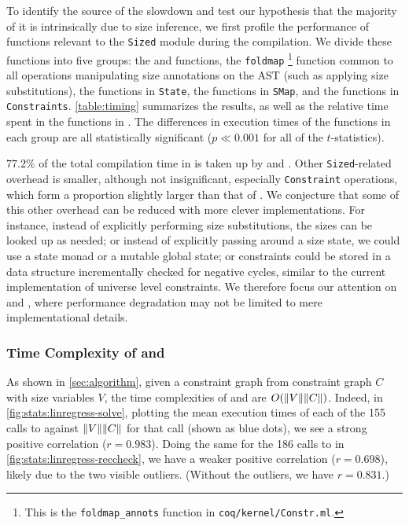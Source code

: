 To identify the source of the slowdown and test our hypothesis that the majority of it
is intrinsically due to size inference,
we first profile the performance of functions relevant to the \texttt{Sized} module during the compilation.
We divide these functions into five groups: the \solve and \RecCheck functions,
the \texttt{foldmap}%
\footnote{This is the \texttt{foldmap\_annots} function in \texttt{coq/kernel/Constr.ml}.}
function common to all operations manipulating size annotations on the AST (such as applying size substitutions),
the functions in \texttt{State}, the functions in \texttt{SMap}, and the functions in \texttt{Constraints}.
\autoref{table:timing} summarizes the results, as well as the relative time spent in the functions in \msetlistsized.
The differences in execution times of the functions in each group are all statistically significant ($p \ll 0.001$ for all of the $t$-statistics).

$77.2\%$ of the total compilation time in \msetlistsized is taken up by \solve and \RecCheck.
Other \texttt{Sized}-related overhead is smaller, although not insignificant,
especially \texttt{Constraint} operations, which form a proportion slightly larger than that of \RecCheck.
We conjecture that some of this other overhead can be reduced with more clever implementations.
For instance, instead of explicitly performing size substitutions, the sizes can be looked up as needed;
or instead of explicitly passing around a size state, we could use a state monad or a mutable global state;
or constraints could be stored in a data structure incrementally checked for negative cycles,
similar to the current implementation of universe level constraints.
We therefore focus our attention on \solve and \RecCheck, where performance degradation may not be limited to mere implementational details.

\subsubsection{Time Complexity of \titlesolve and \titleRecCheck}

As shown in \autoref{sec:algorithm}, given a constraint graph from constraint graph $C$ with size variables $V$,
the time complexities of \solve and \RecCheck are $O(\lVert V\rVert\lVert C\rVert)$.
Indeed, in \autoref{fig:stats:linregress-solve},
plotting the mean execution times of each of the 155 calls to \solve against $\lVert V\rVert\lVert C\rVert$ for that call (shown as blue dots),
we see a strong positive correlation ($r = 0.983$).
Doing the same for the 186 calls to \RecCheck in \autoref{fig:stats:linregress-reccheck},
we have a weaker positive correlation ($r = 0.698$),
likely due to the two visible outliers.
(Without the outliers, we have $r = 0.831$.)

